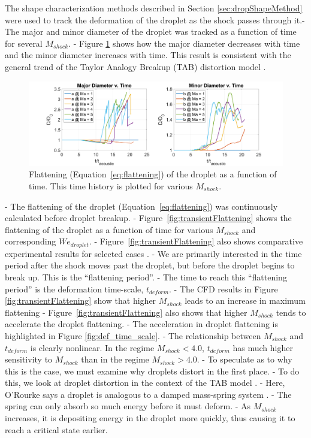 \documentclass{UCF_ETD}
\begin{document}
The shape characterization methods described in Section \ref{sec:dropShapeMethod} were used to track the deformation of the droplet as the shock passes through it.- The major and minor diameter of the droplet was tracked as a function of time for several $M_{shock}$.
- Figure \ref{fig:diameters_v_time} shows how the major diameter decreases with time and the minor diameter increases with time. This result is consistent with the general trend of the Taylor Analogy Breakup (TAB) distortion model \cite{TAB_model}. 

\begin{figure}
\centering
\includegraphics[width=\linewidth]{Figures/Diameters_v_time.png}
\caption{Flattening (Equation~\ref{eq:flattening}) of the droplet as a function of time. This time history is plotted for various $M_{shock}$.}
\label{fig:diameters_v_time}
\end{figure}


- The flattening of the droplet (Equation~\ref{eq:flattening}) was continuously calculated before droplet breakup.
- Figure~\ref{fig:transientFlattening} shows the flattening of the droplet as a function of time for various $M_{shock}$ and corresponding $We_{droplet}$.
- Figure~\ref{fig:transientFlattening} also shows comparative experimental results for selected cases \cite{Briggs2024}. 
- We are primarily interested in the time period after the shock moves past the droplet, but before the droplet begins to break up. This is the ``flattening period''.
- The time to reach this ``flattening period'' is the deformation time-scale, $t_{deform}$.
- The CFD results in Figure \ref{fig:transientFlattening} show that higher $M_{shock}$ leads to an increase in maximum flattening
- Figure~\ref{fig:transientFlattening} also shows that higher $M_{shock}$ tends to accelerate the droplet flattening. 
- The acceleration in droplet flattening is highlighted in Figure \ref{fig:def_time_scale}.
- The relationship between $M_{shock}$ and $t_{deform}$ is clearly nonlinear. In the regime $M_{shock} < 4.0$, $t_{deform}$ has much higher sensitivity to $M_{shock}$ than in the regime $M_{shock} > 4.0$.
- To speculate as to why this is the case, we must examine why droplets distort in the first place. 
- To do this, we look at droplet distortion in the context of the TAB model \cite{TAB_model}.
- Here, O'Rourke says a droplet is analogous to a damped mass-spring system \cite{TAB_model}.
- The spring can only absorb so much energy before it must deform.
- As $M_{shock}$ increases, it is depositing energy in the droplet more quickly, thus causing it to reach a critical state earlier.
\end{document}
